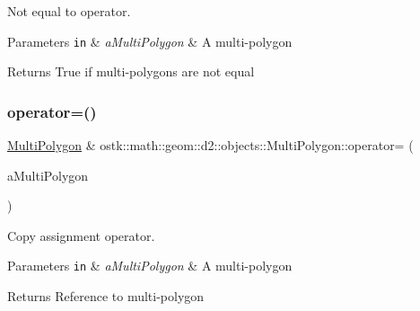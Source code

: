 Not equal to operator. 


\begin{DoxyParams}[1]{Parameters}
\mbox{\tt in}  & {\em a\+Multi\+Polygon} & A multi-\/polygon \\
\hline
\end{DoxyParams}
\begin{DoxyReturn}{Returns}
True if multi-\/polygons are not equal 
\end{DoxyReturn}
\mbox{\label{classostk_1_1math_1_1geom_1_1d2_1_1objects_1_1_multi_polygon_a7864532e16a3db3ced54c09f40218af9}} 
\subsubsection{\texorpdfstring{operator=()}{operator=()}}
{\footnotesize\ttfamily \hyperlink{classostk_1_1math_1_1geom_1_1d2_1_1objects_1_1_multi_polygon}{Multi\+Polygon} \& ostk\+::math\+::geom\+::d2\+::objects\+::\+Multi\+Polygon\+::operator= (\begin{DoxyParamCaption}\item[{const \hyperlink{classostk_1_1math_1_1geom_1_1d2_1_1objects_1_1_multi_polygon}{Multi\+Polygon} \&}]{a\+Multi\+Polygon }\end{DoxyParamCaption})}



Copy assignment operator. 


\begin{DoxyParams}[1]{Parameters}
\mbox{\tt in}  & {\em a\+Multi\+Polygon} & A multi-\/polygon \\
\hline
\end{DoxyParams}
\begin{DoxyReturn}{Returns}
Reference to multi-\/polygon 
\end{DoxyReturn}
\mbox{\label{classostk_1_1math_1_1geom_1_1d2_1_1objects_1_1_multi_polygon_a8f3d731143998dacaaea1f0dffa9fa2c}} 
